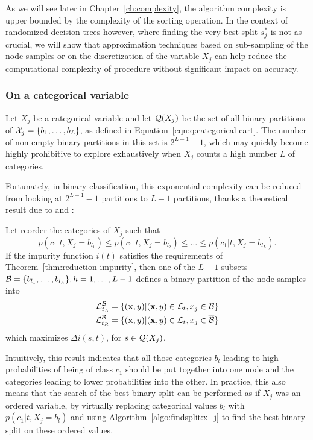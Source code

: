 As we will see later in
Chapter~\ref{ch:complexity}, the algorithm complexity is upper bounded by the
complexity of the sorting operation. In the context of randomized decision
trees however, where finding the very best split $s^*_j$ is not as crucial, we
will show that approximation techniques based on sub-sampling of the node
samples or on the discretization of the variable $X_j$ can help reduce the
computational complexity of procedure without significant impact on accuracy.




\subsubsection{On a categorical variable}
\label{sec:best-split-categorical}

Let $X_j$ be a categorical variable and let ${\cal Q}(X_j)$ be the set of all
binary partitions of ${\cal X}_j= \{ b_1, \dots, b_L \}$, as defined in
Equation~\ref{eqn:q:categorical-cart}. The number of non-empty binary
partitions in this set is $2^{L-1}-1$, which may quickly become highly
prohibitive to  explore exhaustively when $X_j$ counts a high number $L$
of categories.

Fortunately, in binary classification, this exponential complexity can be
reduced from looking at $2^{L-1}-1$ partitions to $L-1$ partitions, thanks a
theoretical result due to \citet{fisher:1958} and \citet{breiman:1984}:
\begin{theorem}\label{thm:categorical-simplification}
Let reorder the categories of $X_j$ such that
$$p(c_1|t,X_j=b_{l_1}) \leq p(c_1|t,X_j=b_{l_2}) \leq \dots \leq p(c_1|t,X_j=b_{l_L}).$$
If the impurity function $i(t)$ satisfies the requirements of Theorem~\ref{thm:reduction-impurity}, then one
of the $L-1$ subsets ${\cal B}=\{b_{l_1}, \dots, b_{l_h}\}, h=1, \dots, L-1$ defines
a binary partition of the node samples into
\begin{align*}
{\cal L}^{\cal B}_{t_L} &= \{(\mathbf{x}, y)|(\mathbf{x}, y)\in {\cal L}_t, x_j \in {\cal B}\}\\
{\cal L}^{\cal B}_{t_R} &= \{(\mathbf{x}, y)|(\mathbf{x}, y)\in {\cal L}_t, x_j \in \overline{{\cal B}}\}
\end{align*}
which maximizes $\Delta i(s, t)$, for $s \in {\cal Q}(X_j)$.
\end{theorem}
Intuitively, this result indicates that all those categories $b_l$ leading to
high probabilities of being of class $c_1$ should be put together into one node
and the categories leading to lower probabilities into the other. In practice,
this also means that the search of the best binary split can be performed as if
$X_j$ was an ordered variable, by virtually replacing categorical values $b_l$
with $p(c_1|t,X_j=b_l)$ and using Algorithm~\ref{algo:findsplit:x_j} to find
the best binary split on these ordered values.

